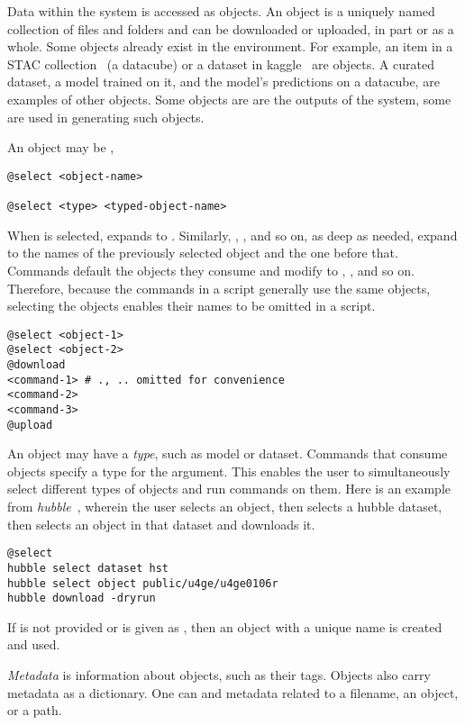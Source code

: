 Data within the system is accessed as objects. An object is a uniquely named collection of files and folders and can be downloaded or uploaded, in part or as a whole. Some objects already exist in the environment. For example, an item in a STAC collection~\cite{stac_intro_tutorial} (a datacube) or a dataset in kaggle~\cite{chen2019-AIRD-dataset} are objects. A curated dataset, a model trained on it, and the model's predictions on a datacube, are examples of other objects. Some objects are are the outputs of the system, some are used in generating such objects.

An object may be ,
%
\begin{verbatim}
@select <object-name>

@select <type> <typed-object-name>
\end{verbatim}
%
When  is selected,  expands to . Similarly, , , and so on, as deep as needed, expand to the names of the previously selected object and the one before that. Commands default the objects they consume and modify to , , and so on. Therefore, because the commands in a script generally use the same objects, selecting the objects enables their names to be omitted in a script.
%
\begin{verbatim}
@select <object-1>
@select <object-2>
@download
<command-1> # ., .. omitted for convenience
<command-2>
<command-3>
@upload
\end{verbatim}

An object may have a \emph{type}, such as model or dataset. Commands that consume objects specify a type for the argument. This enables the user to simultaneously select different types of objects and run commands on them. Here is an example from \emph{hubble}~\cite{hubble}, wherein the user selects an object, then selects a hubble dataset, then selects an object in that dataset and downloads it.
%
\begin{verbatim}
@select
hubble select dataset hst
hubble select object public/u4ge/u4ge0106r
hubble download -dryrun
\end{verbatim}

If  is not provided or is given as \keyword{-}, then an object with a unique name is created and used. 

\emph{Metadata} is information about objects, such as their tags. Objects also carry metadata as a dictionary. One can  and  metadata related to a filename, an object, or a path.


